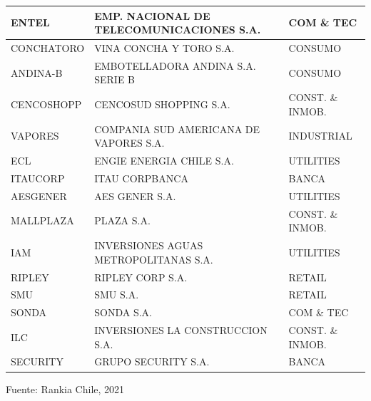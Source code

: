 \documentclass[12pt,letter,spanish]{article}
\begin{document}
\begin{table}[H]
\begin{tabular}{|l|l|l|}
ENTEL                & EMP. NACIONAL DE   TELECOMUNICACIONES S.A. & COM \& TEC         \\ \hline
CONCHATORO           & VINA CONCHA Y   TORO S.A.                  & CONSUMO            \\ \hline
ANDINA-B             & EMBOTELLADORA   ANDINA S.A. SERIE B        & CONSUMO            \\ \hline
CENCOSHOPP           & CENCOSUD   SHOPPING S.A.                   & CONST. \& INMOB.   \\ \hline
VAPORES              & COMPANIA SUD   AMERICANA DE VAPORES S.A.   & INDUSTRIAL         \\ \hline
ECL                  & ENGIE ENERGIA   CHILE S.A.                 & UTILITIES          \\ \hline
ITAUCORP             & ITAU CORPBANCA                             & BANCA              \\ \hline
AESGENER             & AES GENER S.A.                             & UTILITIES          \\ \hline
MALLPLAZA            & PLAZA S.A.                                 & CONST. \& INMOB.   \\ \hline
IAM                  & INVERSIONES   AGUAS METROPOLITANAS S.A.    & UTILITIES          \\ \hline
RIPLEY               & RIPLEY CORP S.A.                           & RETAIL             \\ \hline
SMU                  & SMU S.A.                                   & RETAIL             \\ \hline
SONDA                & SONDA S.A.                                 & COM \& TEC         \\ \hline
ILC                  & INVERSIONES LA   CONSTRUCCION S.A.         & CONST. \& INMOB.   \\ \hline
SECURITY             & GRUPO SECURITY   S.A.                      & BANCA              \\ \hline
\end{tabular}
\centering
\footnotesize Fuente: Rankia Chile, 2021
\end{table}
\newpage
\end{document}
